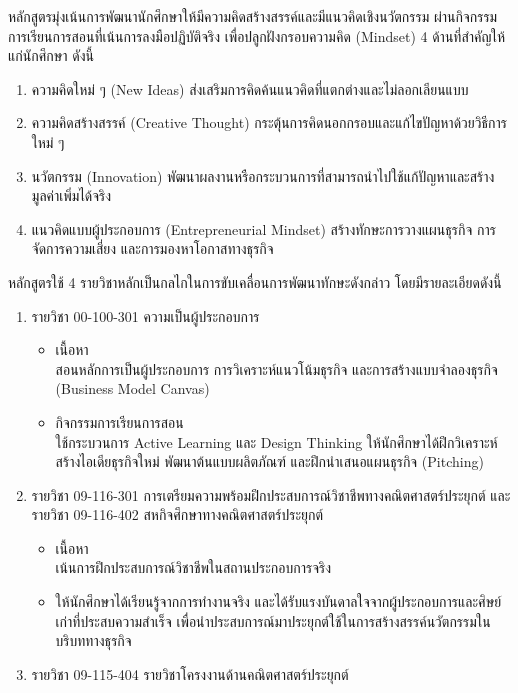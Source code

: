 {{%
หลักสูตรมุ่งเน้นการพัฒนานักศึกษาให้มีความคิดสร้างสรรค์และมีแนวคิดเชิงนวัตกรรม ผ่านกิจกรรมการเรียนการสอนที่เน้นการลงมือปฏิบัติจริง 
เพื่อปลูกฝังกรอบความคิด (Mindset) 4 ด้านที่สำคัญให้แก่นักศึกษา ดังนี้
\begin{enumerate}
	\item ความคิดใหม่ ๆ (New Ideas) ส่งเสริมการคิดค้นแนวคิดที่แตกต่างและไม่ลอกเลียนแบบ
	\item ความคิดสร้างสรรค์ (Creative Thought) กระตุ้นการคิดนอกกรอบและแก้ไขปัญหาด้วยวิธีการใหม่ ๆ
	\item นวัตกรรม (Innovation) พัฒนาผลงานหรือกระบวนการที่สามารถนำไปใช้แก้ปัญหาและสร้างมูลค่าเพิ่มได้จริง
	\item แนวคิดแบบผู้ประกอบการ (Entrepreneurial Mindset) สร้างทักษะการวางแผนธุรกิจ การจัดการความเสี่ยง และการมองหาโอกาสทางธุรกิจ
\end{enumerate}
หลักสูตรใช้ 4 รายวิชาหลักเป็นกลไกในการขับเคลื่อนการพัฒนาทักษะดังกล่าว โดยมีรายละเอียดดังนี้
\begin{enumerate}
	\item รายวิชา 00-100-301 ความเป็นผู้ประกอบการ
	\begin{itemize}
		\item เนื้อหา \\สอนหลักการเป็นผู้ประกอบการ การวิเคราะห์แนวโน้มธุรกิจ และการสร้างแบบจำลองธุรกิจ (Business Model Canvas)
		\item กิจกรรมการเรียนการสอน \\ใช้กระบวนการ Active Learning และ Design Thinking ให้นักศึกษาได้ฝึกวิเคราะห์ สร้างไอเดียธุรกิจใหม่ พัฒนาต้นแบบผลิตภัณฑ์ และฝึกนำเสนอแผนธุรกิจ (Pitching)
	\end{itemize}
		\item รายวิชา 09-116-301 การเตรียมความพร้อมฝึกประสบการณ์วิชาชีพทางคณิตศาสตร์ประยุกต์ และรายวิชา 09-116-402 สหกิจศึกษาทางคณิตศาสตร์ประยุกต์
	\begin{itemize}
		\item เนื้อหา \\เน้นการฝึกประสบการณ์วิชาชีพในสถานประกอบการจริง
		\item ให้นักศึกษาได้เรียนรู้จากการทำงานจริง และได้รับแรงบันดาลใจจากผู้ประกอบการและศิษย์เก่าที่ประสบความสำเร็จ เพื่อนำประสบการณ์มาประยุกต์ใช้ในการสร้างสรรค์นวัตกรรมในบริบททางธุรกิจ
	\end{itemize}
		\item รายวิชา 09-115-404 รายวิชาโครงงานด้านคณิตศาสตร์ประยุกต์

\end{enumerate}}}
